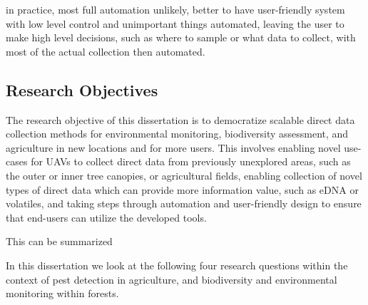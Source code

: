 in practice, most full automation unlikely, better to have user-friendly system with low level control and unimportant things automated, leaving the user to make high level decisions, such as where to sample or what data to collect, with most of the actual collection then automated.

\subsection{Research Objectives}

The research objective of this dissertation is to democratize scalable direct data collection methods for environmental monitoring, biodiversity assessment, and agriculture in new locations and for more users. This involves enabling novel use-cases for UAVs to collect direct data from previously unexplored areas, such as the outer or inner tree canopies, or agricultural fields, enabling collection of novel types of direct data which can provide more information value, such as eDNA or volatiles, and taking steps through automation and user-friendly design to ensure that end-users can utilize the developed tools. 

This can be summarized 




%
In this dissertation we look at the following four research questions within the context of pest detection in agriculture, and biodiversity and environmental monitoring within forests.

